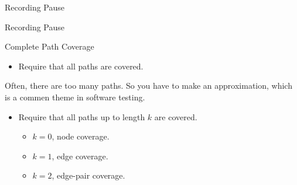 \documentclass[handout]{beamer}
\newcommand{\recordingpause}{
\begin{frame}{Recording Pause}
  \begin{center}
    Recording Pause
  \end{center}
\end{frame}
}
\begin{document}
\recordingpause

\begin{frame}{Complete Path Coverage}
  \begin{itemize}
  \item Require that all paths are covered.
  \end{itemize}
  Often, there are too many paths. So you have to make an
  approximation, which is a commen theme in software testing.
  \begin{itemize}
  \item Require that all paths up to length $k$ are covered.
    \begin{itemize}
    \item $k=0$, node coverage.
    \item $k=1$, edge coverage.
    \item $k=2$, edge-pair coverage.
    \end{itemize}
  \end{itemize}
\end{frame}
\end{document}
